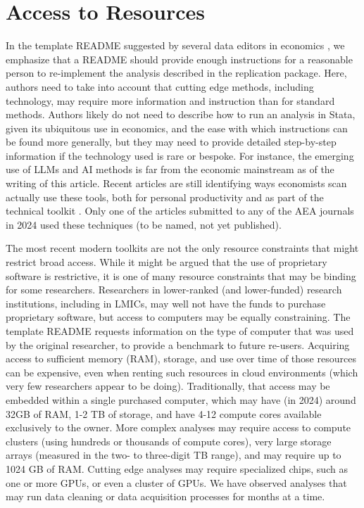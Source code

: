 \documentclass{article}
\begin{document}
\section{Access to Resources}
\label{sec:other_resources}

In the template README suggested by several data editors in economics \parencite{templateREADMEv1.1}, we emphasize that a README should provide enough instructions for a reasonable person to re-implement the analysis described in the replication package. Here, authors need to take into account that cutting edge methods, including technology, may require more information and instruction than for standard methods. Authors likely do not need to describe how to run an analysis in Stata, given its ubiquitous use in economics, and the ease with which instructions can be found more generally, but they may need to provide detailed step-by-step information if the technology used is rare or bespoke. For instance, the emerging use of \acp{LLM} and \ac{AI} methods is far from the economic mainstream as of the writing of this article. Recent articles are still identifying ways economists scan actually use these tools, both for personal productivity \parencite{korinek_generative_2023} and as part of the technical toolkit \parencite{athey_machine_2019,dell_deep_2024}. Only one of the articles submitted to any of the AEA journals in 2024 used these techniques (to be named, not yet published).

The most recent modern toolkits are not the only resource constraints that might restrict broad access. While it might be argued that the use of proprietary software is restrictive, it is one of many resource constraints that may be binding for some researchers. Researchers in lower-ranked (and lower-funded) research institutions, including in \acp{LMIC}, may well not have the funds to purchase proprietary software, but access to computers may be equally constraining. The template README requests information on the type of computer that was used by the original researcher, to provide a benchmark to future re-users. Acquiring access to sufficient memory (\ac{RAM}), storage, and use over time of those resources can be expensive, even when renting such resources in cloud environments (which very few researchers appear to be doing). Traditionally, that access may be embedded within a single purchased computer, which may have (in 2024) around 32GB of RAM, 1-2 TB of storage, and have 4-12 compute cores available exclusively to the owner. More complex analyses may require access to compute clusters (using hundreds or thousands of compute cores), very large storage arrays (measured in the two- to three-digit TB range), and may require up to 1024 GB of RAM. Cutting edge analyses may require specialized chips, such as one or more \acp{GPU}, or even a cluster of \acp{GPU}. We have observed analyses that may run data cleaning or data acquisition processes for months at a time. 
\end{document}
